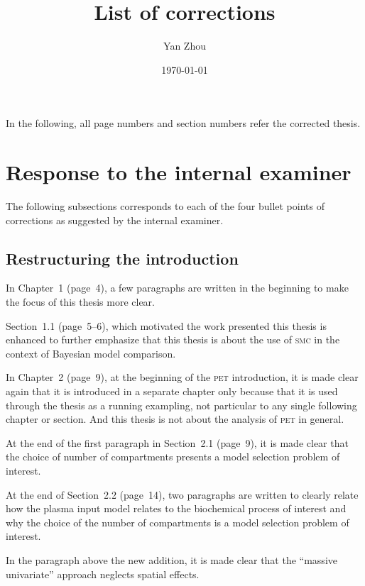 \documentclass[11pt, fontset=Scala]{marticle}
\title{List of corrections}
\author{Yan Zhou}
\date{\today}
\begin{document}
\maketitle

In the following, all page numbers and section numbers refer the corrected thesis.

\section{Response to the internal examiner} %
\label{sec:response_to_the_internal_examiner}

The following subsections corresponds to each of the four bullet points of corrections as suggested by the internal examiner.

\subsection{Restructuring the introduction} %
\label{sub:restructuring_the_introduction_point_1_}

In Chapter~1 (page~4), a few paragraphs are written in the beginning to make the focus of this thesis more clear.

Section~1.1 (page~5--6), which motivated the work presented this thesis is enhanced to further emphasize that this thesis is about the use of \textsc{smc} in the context of Bayesian model comparison.

In Chapter~2 (page~9), at the beginning of the \textsc{pet} introduction, it is made clear again that it is introduced in a separate chapter only because that it is used through the thesis as a running exampling, not particular to any single following chapter or section. And this thesis is not about the analysis of \textsc{pet} in general.

At the end of the first paragraph in Section~2.1 (page~9), it is made clear that the choice of number of compartments presents a model selection problem of interest.

At the end of Section~2.2 (page~14), two paragraphs are written to clearly relate how the plasma input model relates to the biochemical process of interest and why the choice of the number of compartments is a model selection problem of interest.

In the paragraph above the new addition, it is made clear that the ``massive univariate'' approach neglects spatial effects.

\end{document}
